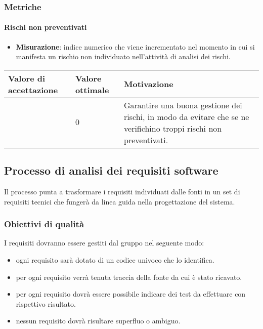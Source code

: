 \subsubsection{Metriche}

\paragraph{Rischi non preventivati}

\begin{itemize}
\item \textbf{Misurazione}: indice numerico che viene incrementato nel momento in cui si manifesta un rischio non individuato nell'attività di analisi dei rischi.
\end{itemize}

\begin{center}
	\begin{tabular}{|P{2.5cm}|P{2.5cm}|P{6cm}|}
		\hline
			\textbf{Valore di accettazione}	& \textbf{Valore ottimale} & \textbf{Motivazione} \\
			\hline
			[$0 - 5$] & $0$ & Garantire una buona gestione dei rischi, in modo da evitare che se ne verifichino troppi rischi non preventivati. \\
			\hline
			\end{tabular}
\end{center}


\subsection{Processo di analisi dei requisiti software}

Il processo punta a trasformare i requisiti individuati dalle fonti in un set di requisiti tecnici che fungerà da linea guida nella progettazione del sistema.

\subsubsection{Obiettivi di qualità}
I requisiti dovranno essere gestiti dal gruppo nel seguente modo:

\begin{itemize}
\item ogni requisito sarà dotato di un codice univoco che lo identifica.
\item per ogni requisito verrà tenuta traccia della fonte da cui è stato ricavato.
\item per ogni requisito dovrà essere possibile indicare dei test da effettuare con rispettivo risultato.
\item nessun requisito dovrà risultare superfluo o ambiguo.
\end{itemize}

